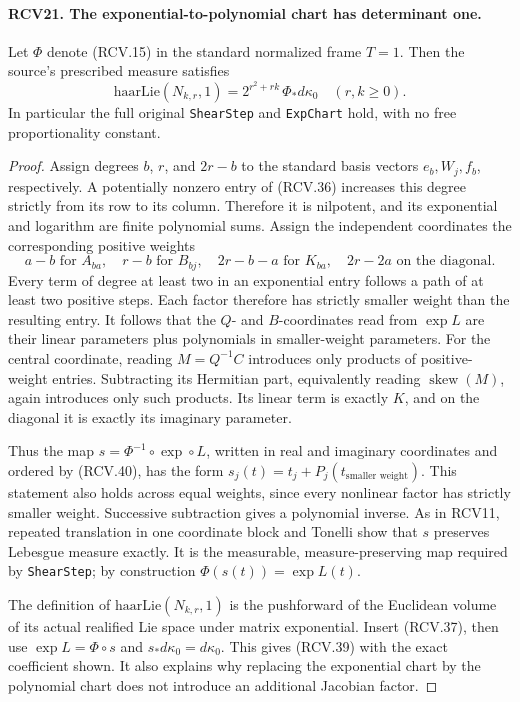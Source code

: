 \documentclass[11pt,a4paper]{article}
\numberwithin{equation}{section}
\theoremstyle{remark}\newtheorem{remark}[theorem]{Remark}
\begin{document}
\paragraph{RCV21. The exponential-to-polynomial chart has determinant one.}
\label{claim:RCV21}
Let \(\Phi\) denote (RCV.15) in the standard normalized frame
\(T=1\).  Then the source's prescribed measure satisfies
\[
 \mathrm{haarLie}(N_{k,r},1)
   =2^{r^2+rk}\,\Phi_*d\kappa_0
                     \quad(r,k\geq0).
\tag{RCV.39}
\]
In particular the full original \texttt{Shear\allowbreak Step} and
\texttt{Exp\allowbreak Chart} hold, with no free proportionality constant.
\begin{proof}
Assign degrees \(b\), \(r\), and \(2r-b\) to the standard
basis vectors \(e_b,W_j,f_b\), respectively.  A potentially
nonzero entry of (RCV.36) increases this degree strictly from its
row to its column.  Therefore it is nilpotent, and its exponential
and logarithm are finite polynomial sums.  Assign the independent
coordinates the corresponding positive weights
\[
 a-b\text{ for }A_{ba},\quad r-b\text{ for }B_{bj},\quad
 2r-b-a\text{ for }K_{ba},\quad 2r-2a\text{ on the diagonal}.
\tag{RCV.40}
\]
Every term of degree at least two in an exponential entry follows
a path of at least two positive steps.  Each factor therefore has
strictly smaller weight than the resulting entry.  It follows that
the \(Q\)- and \(B\)-coordinates read from \(\exp L\) are
their linear parameters plus polynomials in smaller-weight parameters.
For the central coordinate, reading \(M=Q^{-1}C\) introduces
only products of positive-weight entries.  Subtracting its Hermitian
part, equivalently reading \(\operatorname{skew}(M)\), again
introduces only such products.  Its linear term is exactly \(K\),
and on the diagonal it is exactly its imaginary parameter.

Thus the map \(s=\Phi^{-1}\circ\exp\circ L\), written in
real and imaginary coordinates and ordered by (RCV.40), has the form
\(s_j(t)=t_j+P_j(t_{\text{smaller weight}})\).  This statement
also holds across equal weights, since every nonlinear factor has
strictly smaller weight.  Successive subtraction gives a polynomial
inverse.  As in RCV11, repeated translation in one coordinate block
and Tonelli show that \(s\) preserves Lebesgue measure exactly.
It is the measurable, measure-preserving map required by
\texttt{Shear\allowbreak Step}; by construction \(\Phi(s(t))=\exp L(t)\).

The definition of \(\mathrm{haarLie}(N_{k,r},1)\) is the
pushforward of the Euclidean volume of its actual realified Lie
space under matrix exponential.  Insert (RCV.37), then use
\(\exp L=\Phi\circ s\) and \(s_*d\kappa_0=d\kappa_0\).
This gives (RCV.39) with the exact coefficient shown.  It also
explains why replacing the exponential chart by the polynomial
chart does not introduce an additional Jacobian factor.
\end{proof}
\end{document}
